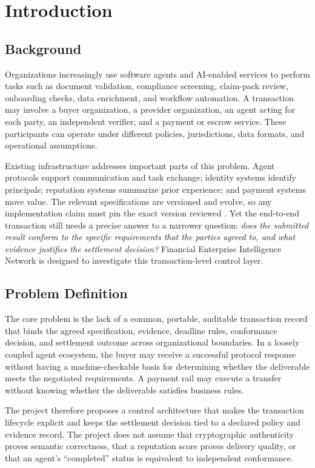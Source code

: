 \documentclass[12pt,a4paper,oneside]{report}
\begin{document}
\chapter{Introduction}
\section{Background}
Organizations increasingly use software agents and AI-enabled services to perform tasks such as document validation, compliance screening, claim-pack review, onboarding checks, data enrichment, and workflow automation. A transaction may involve a buyer organization, a provider organization, an agent acting for each party, an independent verifier, and a payment or escrow service. These participants can operate under different policies, jurisdictions, data formats, and operational assumptions.

Existing infrastructure addresses important parts of this problem. Agent protocols support communication and task exchange; identity systems identify principals; reputation systems summarize prior experience; and payment systems move value. The relevant specifications are versioned and evolve, so any implementation claim must pin the exact version reviewed \cite{a2a,mcp,erc8004,erc8183,x402,ap2}. Yet the end-to-end transaction still needs a precise answer to a narrower question: \emph{does the submitted result conform to the specific requirements that the parties agreed to, and what evidence justifies the settlement decision?} Financial Enterprise Intelligence Network is designed to investigate this transaction-level control layer.

\section{Problem Definition}
The core problem is the lack of a common, portable, auditable transaction record that binds the agreed specification, evidence, deadline rules, conformance decision, and settlement outcome across organizational boundaries. In a loosely coupled agent ecosystem, the buyer may receive a successful protocol response without having a machine-checkable basis for determining whether the deliverable meets the negotiated requirements. A payment rail may execute a transfer without knowing whether the deliverable satisfies business rules.

The project therefore proposes a control architecture that makes the transaction lifecycle explicit and keeps the settlement decision tied to a declared policy and evidence record. The project does not assume that cryptographic authenticity proves semantic correctness, that a reputation score proves delivery quality, or that an agent's ``completed'' status is equivalent to independent conformance.
\end{document}
